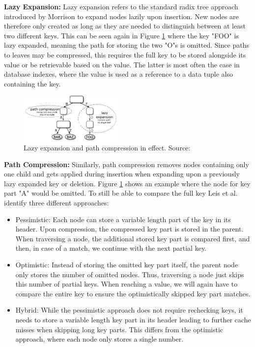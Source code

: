\documentclass[acmtog, nonacm]{acmart}
\begin{document}
\textbf{Lazy Expansion:} 
Lazy expansion refers to the standard radix tree approach introduced by Morrison \cite{10.1145/321479.321481} to 
expand nodes lazily upon insertion. New nodes are therefore only created as long as they are needed to distinguish between at least two different keys. This can be seen
again in Figure \ref{fig:art-vertical-compression} where the key "FOO" is lazy expanded, meaning the path for storing the
two "O"s is omitted. Since paths to leaves may be compressed, this requires the full key to be stored alongside its value 
or be retrievable based on the value. The latter is most often the case in database indexes, where the value 
is used as a reference to a data tuple also containing the key.

\begin{figure}
    \centering
    \includegraphics[width=0.45\textwidth]{images/04-art-vertical-compression.PNG}
    \caption{Lazy expansion and path compression in effect.
    Source: \cite{6544812}}
    \label{fig:art-vertical-compression}
\end{figure}

\textbf{Path Compression:}
Similarly, path compression removes nodes containing only one child and gets applied during insertion when expanding 
upon a previously lazy expanded key or deletion. Figure \ref{fig:art-vertical-compression} shows an example where 
the node for key part "A" would be omitted. To still be able to compare the full key Leis et al. identify three different approaches:
\begin{itemize}
    \item Pessimistic: Each node can store a variable length part of the key in its header. 
    Upon compression, the compressed key part is stored in the parent. When traversing a node, the additional
    stored key part is compared first, and then, in case of a match, we continue with the next partial key.
    \item Optimistic: Instead of storing the omitted key part itself, the parent node only stores the number of 
    omitted nodes. Thus, traversing a node just skips this number of partial keys. When reaching a value, we will 
    again have to compare the entire key to ensure the optimistically skipped key part matches.
    \item Hybrid: While the pessimistic approach does not require rechecking keys, it needs to store a variable length 
    key part in its header leading to further cache misses when skipping long key parts. This differs from the 
    optimistic approach, where each node only stores a single number.
\end{itemize}
\end{document}
